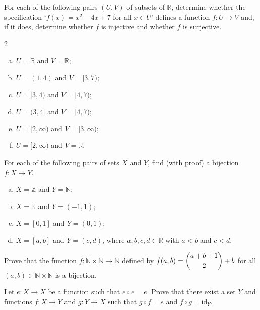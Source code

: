 \begin{chapex}
\label{cqInjectionSurjectionBijection}
For each of the following pairs $(U,V)$ of subsets of $\mathbb{R}$, determine whether the specification `$f(x) = x^2-4x+7$ for all $x \in U$' defines a function $f : U \to V$ and, if it does, determine whether $f$ is injective and whether $f$ is surjective.
\begin{multicols}{2}
\begin{enumerate}[(a)]
\item $U = \mathbb{R}$ and $V = \mathbb{R}$;
\item $U = (1, 4)$ and $V = [3, 7)$;
\item $U = [3, 4)$ and $V = [4, 7)$;
\item $U = (3, 4]$ and $V = [4, 7)$;
\item $U = [2, \infty)$ and $V = [3, \infty)$;
\item $U = [2,\infty)$ and $V = \mathbb{R}$.
\end{enumerate}
\end{multicols}
\end{chapex}

\begin{chapex}
For each of the following pairs of sets $X$ and $Y$, find (with proof) a bijection $f : X \to Y$.
\begin{enumerate}[(a)]
\item $X = \mathbb{Z}$ and $Y = \mathbb{N}$;
\item $X = \mathbb{R}$ and $Y = (-1,1)$;
\item $X = [0,1]$ and $Y = (0,1)$;
\item $X = [a,b]$ and $Y = (c,d)$, where $a,b,c,d \in \mathbb{R}$ with $a<b$ and $c<d$.
\end{enumerate}
\end{chapex}

\begin{chapex}
\label{cqElementaryBijectionNTimesNToN}
Prove that the function $f : \mathbb{N} \times \mathbb{N} \to \mathbb{N}$ defined by $f(a,b) = \dbinom{a+b+1}{2} + b$ for all $(a,b) \in \mathbb{N} \times \mathbb{N}$ is a bijection.
\end{chapex}

\begin{chapex}
\label{exSplitIdempotents}
Let $e : X \to X$ be a function such that $e \circ e = e$. Prove that there exist a set $Y$ and functions $f : X \to Y$ and $g : Y \to X$ such that $g \circ f = e$ and $f \circ g = \mathrm{id}_Y$.
\end{chapex}

